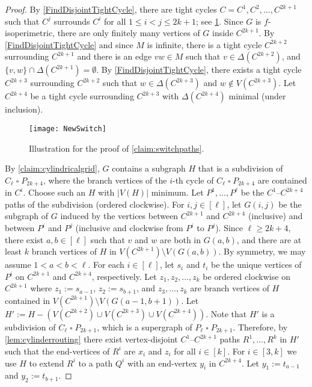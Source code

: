 \documentclass[a4paper,11pt]{article}
\theoremstyle{plain}
\theoremstyle{definition}
\newcommand{\CartProd}{\mathbin{\square}}
\renewcommand{\geq}{\geqslant}
\renewcommand{\leq}{\leqslant}
\begin{document}
\begin{proof}
 By \cref{FindDisjointTightCycle}, there are tight cycles $C=C^1, C^2, \dots, C^{2k+1}$ such that $C^j$ surrounds $C^i$ for all $1 \leq i < j \leq 2k+1$; see \cref{SwitchPaths}.  Since $G$ is $f$-isoperimetric, there are only finitely many vertices of $G$ inside $C^{2k+1}$.  By \cref{FindDisjointTightCycle} and since $M$ is infinite, there is a tight cycle $C^{2k+2}$ surrounding $C^{2k+1}$ and there is an edge $vw \in M$ such that $v \in \Delta(C^{2k+2})$, and $\{v,w\} \cap \Delta(C^{2k+1})=\emptyset$. By \cref{FindDisjointTightCycle}, there exists a tight cycle $C^{2k+3}$ surrounding $C^{2k+2}$ such that $w \in \Delta(C^{2k+3})$ and $w \notin V(C^{2k+3})$.  Let $C^{2k+4}$ be a tight cycle surrounding $C^{2k+3}$ with $\Delta(C^{2k+4})$ minimal (under inclusion).

\begin{figure}[!ht]
\centering
\texttt{[image: NewSwitch]}
\caption{Illustration for the proof of \cref{claim:switchpaths}.\label{SwitchPaths}}
\end{figure}

By \cref{claim:cylindricalgrid}, $G$ contains a subgraph $H$ that is a subdivision of $C_\ell \CartProd P_{2k+4}$, where the branch vertices of the $i$-th cycle of $C_\ell \CartProd P_{2k+4}$ are contained in $C^i$. Choose such an $H$ with $|V(H)|$ minimum.  Let $P^1, \dots, P^\ell$ be the $C^1$--$C^{2k+4}$ paths of the subdivision (ordered clockwise). For $i,j \in [\ell]$, let $G(i,j)$ be the subgraph of $G$ induced by the vertices between $C^{2k+1}$ and $C^{2k+4}$ (inclusive) and between $P^i$ and $P^j$ (inclusive and clockwise from $P^i$ to $P^j$). Since $\ell \geq 2k+4$, there exist $a,b \in [\ell]$ such that $v$ and $w$ are both in $G(a,b)$, and there are at least $k$  branch vertices of $H$ in $V(C^{2k+1}) \setminus V(G(a,b))$. By symmetry, we may assume $1<a<b<\ell$.  For each $i \in [\ell]$, let $s_i$ and $t_i$ be the unique vertices of $P^i$ on $C^{2k+1}$ and $C^{2k+4}$, respectively.  Let $z_1, z_2, \dots, z_k$ be ordered clockwise on $C^{2k+1}$ where $z_1:=s_{a-1}$, $z_2:=s_{b+1}$, and $z_3, \dots, z_k$ are branch vertices of $H$ contained in $V(C^{2k+1}) \setminus V(G(a-1,b+1))$. 
Let $H':=H-(V(C^{2k+2}) \cup V(C^{2k+3}) \cup V(C^{2k+4}))$.  Note that $H'$ is a subdivision of $C_\ell \CartProd P_{2k+1}$, which is a supergraph of $P_\ell \CartProd P_{2k+1}$.  Therefore,  by \cref{lem:cylinderrouting} there exist vertex-disjoint $C^1$--$C^{2k+1}$ paths $R^1, \dots, R^k$ in $H'$ such that the end-vertices of $R^i$ are $x_i$ and $z_i$ for all $i \in [k]$. For $i \in [3,k]$ we use $H$ to extend $R^i$ to a path $Q^i$ with an end-vertex $y_i$ in $C^{2k+4}$.  Let $y_1:=t_{a-1}$ and $y_2:=t_{b+1}$. 


\end{proof}
\end{document}
